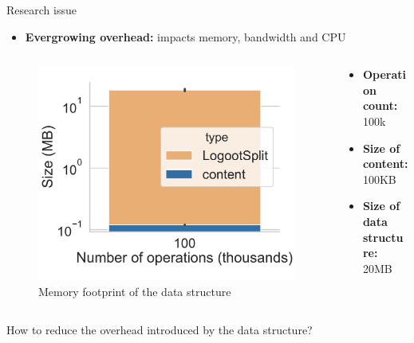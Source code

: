 \documentclass[10pt]{beamer}
\begin{document}
\begin{frame}{Research issue}

  \begin{itemize}
    \item \textbf{Evergrowing overhead:} impacts memory, bandwidth and CPU
  \end{itemize}

  \begin{columns}
    \begin{column}{0.45\textwidth}
      \begin{figure}
        \centering
        \includegraphics[width=\textwidth]{img/overhead-size.pdf}
        \caption{Memory footprint of the data structure}
      \end{figure}
    \end{column}
    \begin{column}{0.55\textwidth}
      \begin{itemize}
        \item \textbf{Operation count:} 100k
        \item \textbf{Size of content:} 100KB
        \item \textbf{Size of data structure:} 20MB
      \end{itemize}
    \end{column}
  \end{columns}

  \centering
  \alert{How to reduce the overhead introduced by the data structure?}
\end{frame}
\end{document}
